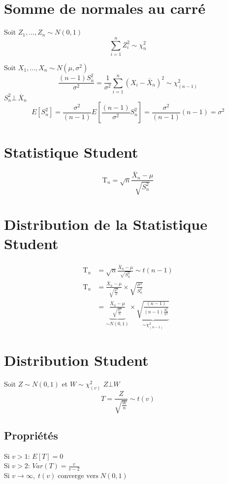 \section{Somme de normales au carré}\label{somme-de-normales-au-carre}

Soit \(Z_1,\dots,Z_n\sim N(0,1)\) \[
\sum_{i=1}^n Z_i^2\sim \chi^2_n
\]

Soit \(X_1,\dots,X_n\sim N(\mu,\sigma^2)\) \[
\frac{(n-1)S^2_n}{\sigma^2}= \frac{1}{\sigma^2}\sum^n_{i=1}(X_i-\bar{X}_n)^2\sim \chi^2_{(n-1)}
\] \(S^2_n\bot\,\bar{X}_n\) \[
E[S^2_n]= \frac{\sigma^2}{(n-1)}E\left[\frac{(n-1)}{\sigma^2}S^2_n\right]=\frac{\sigma^2}{(n-1)}(n-1)=\sigma^2
\]

\section{Statistique Student}\label{stats:stats:student}

\[
\text{T}_n= \sqrt{n}\frac{\bar{X}_n-\mu}{\sqrt{S_n^2}}
\]

\section{Distribution de la Statistique Student}\label{stats:dist:student}

\begin{align*}
    \text{T}_n& =\sqrt{n} \frac{\bar{X}_n -\mu}{\sqrt{S^2_n}}\sim t(n-1)\\
    \text{T}_n& =\frac{\bar{X}_n-\mu}{\sqrt{\frac{\sigma^2}{n}}}\times\sqrt{\frac{\sigma^2}{S^2_n}}\\
    & =\underbrace{\frac{\bar{X}_n-\mu}{\sqrt{\frac{\sigma^2}{n}}}}_{\sim N(0,1)}\times\underbrace{\sqrt{\frac{(n-1)}{(n-1)\frac{S^2_n}{\sigma^2}}}}_{\sim \chi_{(n-1)}^2}
\end{align*}

\section{Distribution Student}\label{distribution-student}

Soit \(Z\sim N(0,1)\) et \(W\sim \chi^2_{(v)}\) \(Z\bot W\) \[
T=\frac{Z}{\sqrt{\frac{W}{n}}}\sim t(v)
\] 
\subsection*{Propriétés}

Si \(v>1\): \(E[T]=0\)\\
Si \(v>2\): \(Var(T)=\frac{v}{v-2}\)\\
Si \(v\rightarrow \infty,\;t(v)\;\text{converge vers}\;N(0,1)\)

